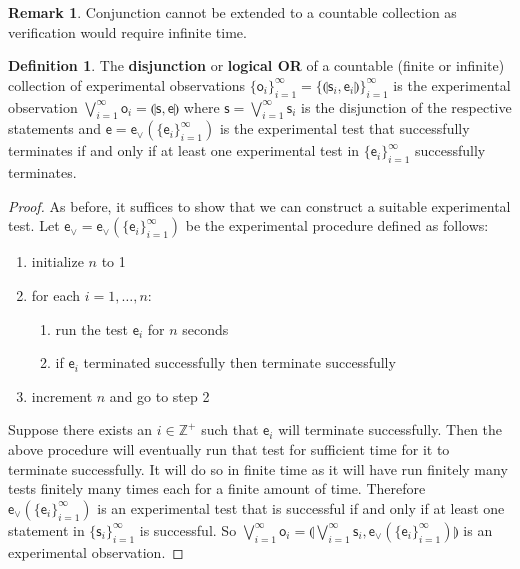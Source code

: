 \documentclass{amsart}
\theoremstyle{definition}
\newtheorem{defn}[thm]{Definition}
\newtheorem{rem}[thm]{Remark}
\numberwithin{equation}{section}
\begin{document}
\begin{rem}
	Conjunction cannot be extended to a countable collection as verification would require infinite time.
\end{rem}

\begin{defn}
	The \textbf{disjunction} or \textbf{logical OR} of a countable (finite or infinite) collection of experimental observations $\{\mathsf{o}_i\}_{i=1}^{\infty}=\{\llparenthesis \mathsf{s}_i, \mathsf{e}_i\rrparenthesis\}_{i=1}^{\infty}$ is the experimental observation $\bigvee\limits_{i=1}^{\infty} \mathsf{o}_i = \llparenthesis \mathsf{s}, \mathsf{e}\rrparenthesis$ where $\mathsf{s} = \bigvee\limits_{i=1}^{\infty} \mathsf{s}_i$ is the disjunction of the respective statements and $\mathsf{e} = \mathsf{e}_\vee(\{\mathsf{e}_i\}_{i=1}^{\infty})$ is the experimental test that successfully terminates if and only if at least one experimental test in $\{\mathsf{e}_i\}_{i=1}^{\infty}$ successfully terminates.
\end{defn}

\begin{proof}
	As before, it suffices to show that we can construct a suitable experimental test. Let $\mathsf{e}_\vee=\mathsf{e}_\vee(\{\mathsf{e}_i\}_{i=1}^{\infty})$ be the experimental procedure defined as follows:
	\begin{enumerate}
	\item initialize $n$ to 1
	\item for each $i=1,\ldots,n$:
	\begin{enumerate}
		\item run the test $\mathsf{e}_i$ for $n$ seconds
		\item if $\mathsf{e}_i$ terminated successfully then terminate successfully
	\end{enumerate}
	\item increment $n$ and go to step 2
	\end{enumerate}
	Suppose there exists an $i \in \mathbb{Z}^+$ such that $\mathsf{e}_i$ will terminate successfully. Then the above procedure will eventually run that test for sufficient time for it to terminate successfully. It will do so in finite time as it will have run finitely many tests finitely many times each for a finite amount of time. Therefore $\mathsf{e}_\vee(\{\mathsf{e}_i\}_{i=1}^{\infty})$ is an experimental test that is successful if and only if at least one statement in $\{\mathsf{s}_i\}_{i=1}^{\infty}$ is successful. So $\bigvee\limits_{i=1}^{\infty} \mathsf{o}_i =\llparenthesis\bigvee\limits_{i=1}^{\infty} \mathsf{s}_i, \mathsf{e}_{\vee}(\{\mathsf{e}_i\}_{i=1}^{\infty})\rrparenthesis$ is an experimental observation.
\end{proof}
\end{document}
